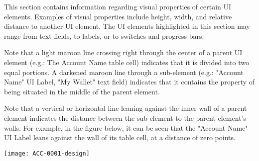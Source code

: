
This section contains information regarding visual properties of certain UI elements. Examples of visual properties include height, width, and relative distance to another UI element. The UI elements highlighted in this section may range from text fields, to labels, or to switches and progress bars. \newline

Note that a light maroon line crossing right through the center of a parent UI element (e.g.: The Account Name table cell) indicates that it is divided into two equal portions. A darkened maroon line through a sub-element (e.g.: "Account Name" UI Label, "My Wallet" text field) indicates that it contains the property of being situated in the middle of the parent element. \newline

Note that a vertical or horizontal line leaning against the inner wall of a parent element indicates the distance between the sub-element to the parent element's walls. For example, in the figure below, it can be seen that the "Account Name" UI Label leans against the wall of its table cell, at a distance of zero points.

\centerline{\texttt{[image: ACC-0001-design]}}